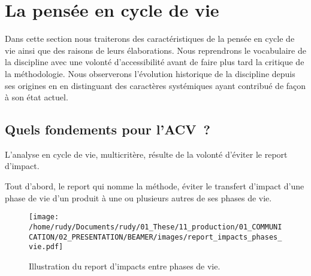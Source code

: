 \section{La pensée en cycle de vie}
\label{sec:La pensée en cycle de vie}
Dans cette section nous traiterons des caractéristiques de la pensée en cycle de vie ainsi que des raisons de leurs élaborations.
Nous reprendrons le vocabulaire de la discipline avec une volonté d'accessibilité avant de faire plus tard la critique de la méthodologie.
Nous observerons l'évolution historique de la discipline depuis ses origines en en distinguant des caractères systémiques ayant contribué de façon à son état actuel.

\subsection{Quels fondements pour l'ACV~?}
L'analyse en cycle de vie, multicritère, résulte de la volonté d'éviter le report d'impact.

Tout d'abord, le report qui nomme la méthode, éviter le transfert d'impact d'une phase de vie d'un produit à une ou plusieurs autres de ses phases de vie.
\begin{figure}[htbp]
\centering
\texttt{[image: /home/rudy/Documents/rudy/01\_These/11\_production/01\_COMMUNICATION/02\_PRESENTATION/BEAMER/images/report\_impacts\_phases\_vie.pdf]}
\caption{Illustration du report d'impacts entre phases de vie.}
\label{fig:report_impacts_phases_vie}
\end{figure}


